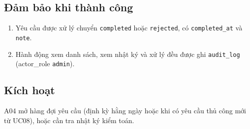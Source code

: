 \subsection{Đảm bảo khi thành công}
\begin{enumerate}
\item Yêu cầu được xử lý chuyển {\small\texttt{completed}} hoặc {\small\texttt{rejected}}, có {\small\texttt{completed\_\allowbreak{}\allowbreak{}at}} và {\small\texttt{note}}.
\item Hành động xem danh sách, xem nhật ký và xử lý đều được ghi {\small\texttt{audit\_\allowbreak{}\allowbreak{}log}} (actor\_\allowbreak{}role {\small\texttt{admin}}).
\end{enumerate}
\subsection{Kích hoạt}
A04 mở hàng đợi yêu cầu (định kỳ hằng ngày hoặc khi có yêu cầu thủ công mới từ UC08), hoặc cần tra nhật ký kiểm toán.

